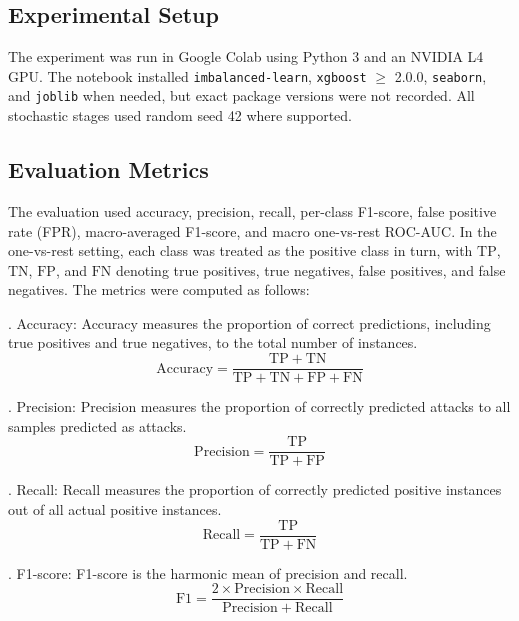 \documentclass[conference,a4paper]{IEEEtran}
\begin{document}
\subsection{Experimental Setup}

The experiment was run in Google Colab using Python 3 and an NVIDIA L4 GPU. The notebook installed \texttt{imbalanced-learn}, \texttt{xgboost} \(\geq\) 2.0.0, \texttt{seaborn}, and \texttt{joblib} when needed, but exact package versions were not recorded. All stochastic stages used random seed 42 where supported.

\subsection{Evaluation Metrics}

The evaluation used accuracy, precision, recall, per-class F1-score, false positive rate (FPR), macro-averaged F1-score, and macro one-vs-rest ROC-AUC. In the one-vs-rest setting, each class was treated as the positive class in turn, with \(\mathrm{TP}\), \(\mathrm{TN}\), \(\mathrm{FP}\), and \(\mathrm{FN}\) denoting true positives, true negatives, false positives, and false negatives. The metrics were computed as follows:

\noindent{}. Accuracy: Accuracy measures the proportion of correct predictions, including true positives and true negatives, to the total number of instances.
\begin{equation}
\mathrm{Accuracy} = \frac{\mathrm{TP}+\mathrm{TN}}{\mathrm{TP}+\mathrm{TN}+\mathrm{FP}+\mathrm{FN}}
\label{eq:accuracy}
\end{equation}

\noindent{}. Precision: Precision measures the proportion of correctly predicted attacks to all samples predicted as attacks.
\begin{equation}
\mathrm{Precision} = \frac{\mathrm{TP}}{\mathrm{TP}+\mathrm{FP}}
\label{eq:precision}
\end{equation}

\noindent{}. Recall: Recall measures the proportion of correctly predicted positive instances out of all actual positive instances.
\begin{equation}
\mathrm{Recall} = \frac{\mathrm{TP}}{\mathrm{TP}+\mathrm{FN}}
\label{eq:recall}
\end{equation}

\noindent{}. F1-score: F1-score is the harmonic mean of precision and recall.
\begin{equation}
\mathrm{F1} = \frac{2 \times \mathrm{Precision} \times \mathrm{Recall}}{\mathrm{Precision}+\mathrm{Recall}}
\label{eq:f1}
\end{equation}
\end{document}
